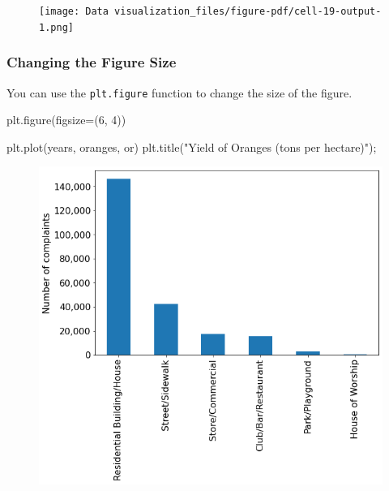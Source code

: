 \documentclass[
  letterpaper,
  DIV=11,
  numbers=noendperiod]{scrreprt}
\newenvironment{Shaded}{\begin{snugshade}}{\end{snugshade}}
\newcommand{\DecValTok}[1]{\textcolor[rgb]{0.68,0.00,0.00}{#1}}
\newcommand{\NormalTok}[1]{\textcolor[rgb]{0.00,0.23,0.31}{#1}}
\newcommand{\OperatorTok}[1]{\textcolor[rgb]{0.37,0.37,0.37}{#1}}
\newcommand{\StringTok}[1]{\textcolor[rgb]{0.13,0.47,0.30}{#1}}
\begin{document}
\begin{figure}[H]

{\centering \texttt{[image: Data visualization\_files/figure-pdf/cell-19-output-1.png]}

}

\end{figure}

\hypertarget{changing-the-figure-size}{%
\subsubsection{Changing the Figure
Size}\label{changing-the-figure-size}}

You can use the \texttt{plt.figure} function to change the size of the
figure.

\begin{Shaded}
\begin{Highlighting}[]
\NormalTok{plt.figure(figsize}\OperatorTok{=}\NormalTok{(}\DecValTok{6}\NormalTok{, }\DecValTok{4}\NormalTok{))}

\NormalTok{plt.plot(years, oranges, }\StringTok{\textquotesingle{}or\textquotesingle{}}\NormalTok{)}
\NormalTok{plt.title(}\StringTok{"Yield of Oranges (tons per hectare)"}\NormalTok{)}\OperatorTok{;}
\end{Highlighting}
\end{Shaded}

\begin{figure}[H]

{\centering \includegraphics{Data visualization_files/figure-pdf/cell-20-output-1.png}

}

\end{figure}
\end{document}
